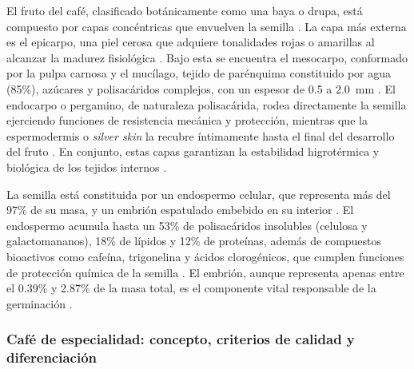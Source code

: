 El fruto del café, clasificado botánicamente como una baya o drupa, está compuesto 
por capas concéntricas que envuelven la semilla \parencite{de_bruyn_exploring_2017, 
jorge_a_d_jesus_molecular_2025}. La capa más externa es el epicarpo, una piel cerosa 
que adquiere tonalidades rojas o amarillas al alcanzar la madurez fisiológica 
\parencite{polakova_changes_2022, ferreira_impact_2024}. Bajo esta se encuentra el 
mesocarpo, conformado por la pulpa carnosa y el mucílago, tejido de parénquima 
constituido por agua (85\%), azúcares y polisacáridos complejos, con un espesor de 
0.5 a 2.0~mm \parencite{ferreira_impact_2024, de_bruyn_exploring_2017, 
jorge_a_d_jesus_molecular_2025, polakova_changes_2022}. El endocarpo o pergamino, 
de naturaleza polisacárida, rodea directamente la semilla ejerciendo funciones de 
resistencia mecánica y protección, mientras que la espermodermis o \textit{silver 
skin} la recubre íntimamente hasta el final del desarrollo del fruto 
\parencite{polakova_changes_2022, baschenis_comparative_2026, 
jorge_a_d_jesus_molecular_2025, de_bruyn_exploring_2017, hasan_comparative_2024}. 
En conjunto, estas capas garantizan la estabilidad higrotérmica y biológica de los 
tejidos internos \parencite{osorio_hernandez_bioclimatic_2018, 
osorio_hernandez_computational_2020}.

La semilla está constituida por un endospermo celular, que representa más del 97\% 
de su masa, y un embrión espatulado embebido en su interior 
\parencite{baschenis_comparative_2026}. El endospermo acumula hasta un 53\% de 
polisacáridos insolubles (celulosa y galactomananos), 18\% de lípidos y 12\% de 
proteínas, además de compuestos bioactivos como cafeína, trigonelina y ácidos 
clorogénicos, que cumplen funciones de protección química de la semilla 
\parencite{ferreira_impact_2024, baschenis_comparative_2026, de_bruyn_exploring_2017}. 
El embrión, aunque representa apenas entre el 0.39\% y 2.87\% de la masa total, es 
el componente vital responsable de la germinación 
\parencite{baschenis_comparative_2026}.

\subsubsection{Café de especialidad: concepto, criterios de calidad y diferenciación}

